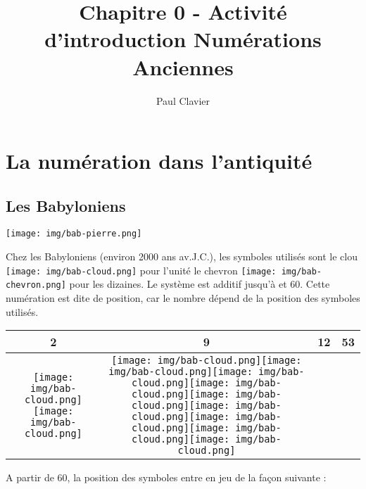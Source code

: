 \documentclass[12pt,a4paper]{article}
\author{Paul Clavier}
\title{Chapitre 0 - Activité d'introduction Numérations Anciennes}
\begin{document}
\renewcommand\thesection{\Roman{section}}
\renewcommand\thesubsection{\arabic{subsection}}


\ifdefined\isprof
	\TeacherModeOn
\fi



\newcommand{\clou}{\texttt{[image: img/bab-cloud.png]}}
\newcommand{\chevron}{\texttt{[image: img/bab-chevron.png]}}


\begin{center}
\end{center}

\section{La numération dans l'antiquité}
\subsection{Les Babyloniens}

\begin{minipage}{0.2\textwidth}
\texttt{[image: img/bab-pierre.png]} 
\end{minipage}
\begin{minipage}{0.8\textwidth}

Chez les Babyloniens (environ 2000 ans av.J.C.), les symboles utilisés sont le clou \texttt{[image: img/bab-cloud.png]} pour l’unité le chevron \texttt{[image: img/bab-chevron.png]} pour les dizaines. Le système est additif jusqu’à et 60. 
Cette numération est dite de position, car le nombre dépend de la position des symboles utilisés.
\begin{center}
\begin{tabular}{|c|c|c|c|}
\hline
2 & 9 & 12 & 53 \\ \hline
\clou\clou & \clou\clou\clou\clou\clou\clou\clou\clou\clou & \thead{\chevron\clou\clou} & \thead{\chevron\chevron\chevron\chevron\chevron\clou\clou\clou}
\\ \hline
\end{tabular}
\end{center}
A partir de 60, la position des symboles entre en jeu de la façon suivante : 
\end{minipage}
\end{document}
